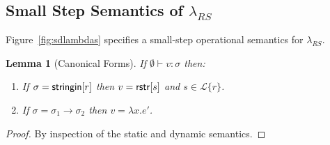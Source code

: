 \documentclass[11pt,leqno]{article}
\newtheorem{trthm}[tr]{Theorem}
\newtheorem{trlem}[tr]{Lemma}
\newtheorem{trdef}[tr]{Definition}
\newtheorem{trconj}[tr]{Conjecture}
\theoremstyle{definition}
\newcommand{\Lagr}{\mathcal{L}}
\newcommand{\lang}[1]{\Lagr\{#1\}}
\newcommand{\lambdas}{\lambda_{RS}}
\newcommand{\val}{{\sf val}}
\newcommand{\stringin}[1]{{\sf stringin}[#1]}
\begin{document}
\subsection{Small Step Semantics of $\lambdas$}
Figure~\ref{fig:sdlambdas} specifies a small-step operational semantics for $\lambdas$. 



\begin{trlem}[Canonical Forms]\label{cfgen}
If $\emptyset \vdash v : \sigma$ then:
\begin{enumerate}
\item If $\sigma = \stringin{r}$ then $v = {\sf rstr}[s]$ and $s \in \lang{r}$.
\item If $\sigma = \sigma_1 \rightarrow \sigma_2$ then $v = \lambda x . e'$.
\end{enumerate}

\end{trlem}
\begin{proof}
By inspection of the static and dynamic semantics.
\end{proof}
\end{document}
